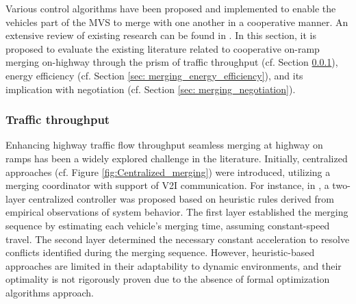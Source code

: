 Various control algorithms have been proposed and implemented to enable the vehicles part of the MVS to merge with one another in a cooperative manner. An extensive review of existing research can be found in \cite{7562449}\cite{awal2013optimal}\cite{zhu2022merging}\cite{bevly2016lane}. In this section, it is proposed to evaluate the existing literature related to cooperative on-ramp merging on-highway through the prism of traffic throughput (cf. Section \ref{sec: on-ramp_traffic_throughput}), energy efficiency (cf. Section \ref{sec: merging_energy_efficiency}), and its implication with negotiation (cf. Section \ref{sec: merging_negotiation}). 

\subsubsection{Traffic throughput} \label{sec: on-ramp_traffic_throughput}
Enhancing highway traffic flow throughput seamless merging at highway on ramps has been a widely explored challenge in the literature. Initially, centralized approaches (cf. Figure \ref{fig:Centralized_merging}) were introduced, utilizing a merging coordinator with support of V2I communication. For instance, in \cite{4047597}, a two-layer centralized controller was proposed based on heuristic rules derived from empirical observations of system behavior. The first layer established the merging sequence by estimating each vehicle's merging time, assuming constant-speed travel. The second layer determined the necessary constant acceleration to resolve conflicts identified during the merging sequence. However, heuristic-based approaches are limited in their adaptability to dynamic environments, and their optimality is not rigorously proven due to the absence of formal optimization algorithms approach. 

